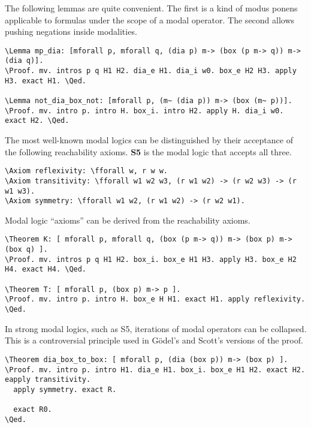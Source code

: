 \documentclass{llncs}
\newcommand{\red}[1]{\textcolor[rgb]{1,0,0}{#1}}
\newcommand{\blue}[1]{\textcolor[rgb]{0,0,1}{#1}}
\newcommand{\Axiom}{\red{Axiom}}
\newcommand{\Lemma}{\red{Lemma}}
\newcommand{\Theorem}{\red{Theorem}}
\newcommand{\fforall}{\blue{forall}}
\newcommand{\Proof}{\blue{Proof}}
\newcommand{\Qed}{\blue{Qed}}
\begin{document}
\noindent
The following lemmas are quite convenient. The first is a kind of modus ponens applicable to formulas under the scope of a modal operator. The second allows pushing negations inside modalities.

\begin{Verbatim}[commandchars=\\\{\},fontsize=\verbsize]
\Lemma mp_dia: [mforall p, mforall q, (dia p) m-> (box (p m-> q)) m-> (dia q)].
\Proof. mv. intros p q H1 H2. dia_e H1. dia_i w0. box_e H2 H3. apply H3. exact H1. \Qed.

\Lemma not_dia_box_not: [mforall p, (m~ (dia p)) m-> (box (m~ p))].
\Proof. mv. intro p. intro H. box_i. intro H2. apply H. dia_i w0. exact H2. \Qed.
\end{Verbatim}

\noindent
The most well-known modal logics can be distinguished by their acceptance of the following reachability axioms. \textbf{S5} is the modal logic that accepts all three.

\begin{Verbatim}[commandchars=\\\{\},fontsize=\verbsize]
\Axiom reflexivity: \fforall w, r w w.
\Axiom transitivity: \fforall w1 w2 w3, (r w1 w2) -> (r w2 w3) -> (r w1 w3).
\Axiom symmetry: \fforall w1 w2, (r w1 w2) -> (r w2 w1).
\end{Verbatim}

\noindent
Modal logic ``axioms'' can be derived from the reachability axioms.

\begin{Verbatim}[commandchars=\\\{\},fontsize=\verbsize]
\Theorem K: [ mforall p, mforall q, (box (p m-> q)) m-> (box p) m-> (box q) ].
\Proof. mv. intros p q H1 H2. box_i. box_e H1 H3. apply H3. box_e H2 H4. exact H4. \Qed.

\Theorem T: [ mforall p, (box p) m-> p ].
\Proof. mv. intro p. intro H. box_e H H1. exact H1. apply reflexivity. \Qed.
\end{Verbatim}

\noindent
In strong modal logics, such as S5, iterations of modal operators can be collapsed. This is a controversial principle used in G\"odel's and Scott's versions of the proof.

\begin{Verbatim}[commandchars=\\\{\},fontsize=\verbsize]
\Theorem dia_box_to_box: [ mforall p, (dia (box p)) m-> (box p) ].
\Proof. mv. intro p. intro H1. dia_e H1. box_i. box_e H1 H2. exact H2. eapply transitivity.
  apply symmetry. exact R.

  exact R0.
\Qed.
\end{Verbatim}
\end{document}
